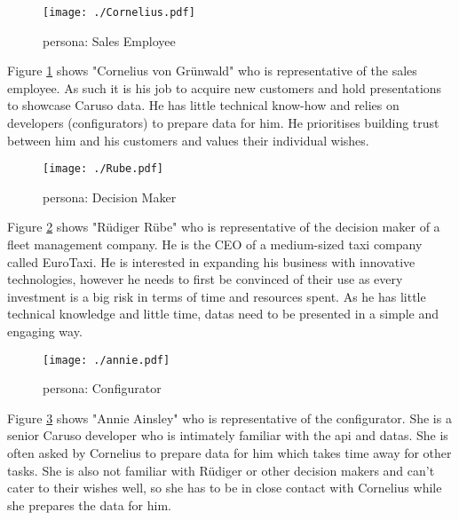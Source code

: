 \begin{figure}[ht]
  \centering
  \texttt{[image: ./Cornelius.pdf]}
  \caption{\Gls{persona}: Sales Employee }
  \label{Persona:Cornelius}
\end{figure}
Figure \ref{Persona:Cornelius} shows "Cornelius von Grünwald" who is representative of the sales employee. As such it is his job to acquire new customers and hold presentations to showcase Caruso data. He has little technical know-how and relies on developers (configurators) to prepare data for him. He prioritises building trust between him and his customers and values their individual wishes.

\begin{figure}[ht]
  \centering
  \texttt{[image: ./Rube.pdf]}
  \caption{\Gls{persona}: Decision Maker}
  \label{Persona:Rube}
\end{figure}
Figure \ref{Persona:Rube} shows "Rüdiger Rübe" who is representative of the decision maker of a fleet management company. He is the CEO of a medium-sized taxi company called EuroTaxi. He is interested in expanding his business with innovative technologies, however he needs to first be convinced of their use as every investment is a big risk in terms of time and resources spent. As he  has little technical knowledge and little time, \glspl{data} need to be presented in a simple and engaging way. 

\begin{figure}[ht]
  \centering
  \texttt{[image: ./annie.pdf]}
  \caption{\Gls{persona}: Configurator}
  \label{Persona:Annie}
\end{figure}
Figure \ref{Persona:Annie} shows "Annie Ainsley" who is representative of the configurator. She is a senior Caruso developer who is intimately familiar with the \gls{api} and \glspl{data}. She is often asked by Cornelius to prepare data for him which takes time away for other tasks. She is also not familiar with Rüdiger or other decision makers and can't cater to their wishes well, so she has to be in close contact with Cornelius while she prepares the data for him.